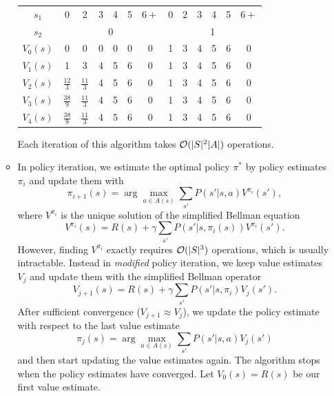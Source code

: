 \documentclass[11pt, a4paper]{article}
\begin{document}
\begin{enumerate}
\begin{solution}
\begin{itemize}
            \begin{table}[h]
                \centering
                \begin{tabular}{c|cccccc|cccccc}
                    \toprule
                    $s_1$    & 0 & 2 & 3 & 4 & 5 & $6+$ & 0 & 2 & 3 & 4 & 5 & $6+$ \\
                    $s_2$    & \multicolumn{6}{c|}{0}   & \multicolumn{6}{c}{1}    \\
                    \midrule
                    $V_0(s)$ & 0 & 0 & 0 & 0 & 0 & 0    & 1 & 3 & 4 & 5 & 6 & 0    \\
                    $V_1(s)$ & 1 & 3 & 4 & 5 & 6 & 0    & 1 & 3 & 4 & 5 & 6 & 0    \\
                    $V_2(s)$ & $\frac{12}{3}$ & $\frac{11}{3}$ & 4 & 5 & 6 & 0 & 1 & 3 & 4 & 5 & 6 & 0 \\
                    $V_3(s)$ & $\frac{38}{9}$ & $\frac{11}{3}$ & 4 & 5 & 6 & 0 & 1 & 3 & 4 & 5 & 6 & 0 \\
                    $V_4(s)$ & $\frac{38}{9}$ & $\frac{11}{3}$ & 4 & 5 & 6 & 0 & 1 & 3 & 4 & 5 & 6 & 0 \\
                    \bottomrule
                \end{tabular}
            \end{table}

            Each iteration of this algorithm takes $\mathcal{O}(\lvert S\rvert^2 \lvert A\rvert)$ operations.

            \item In policy iteration, we estimate the optimal policy $\pi^*$ by policy estimates $\pi_i$ and update them with
            \begin{equation*}
                \pi_{i+1}(s) = \arg \max_{a \in A(s)} \sum_{s'} P(s' | s, a) V^{\pi_i}(s'),
            \end{equation*}
            where $V^{\pi_i}$ is the unique solution of the simplified Bellman equation
            \begin{equation*}
                V^{\pi_i}(s) = R(s) + \gamma \sum_{s'} P(s' | s, \pi_i(s)) V^{\pi_i}(s') .
            \end{equation*}
            However, finding $V^{\pi_i}$ exactly requires $\mathcal{O}(\lvert S\rvert^3)$ operations, which is usually intractable. Instead in \emph{modified} policy iteration, we keep value estimates $V_j$ and update them with the simplified Bellman operator
            \begin{equation*}
                V_{j + 1}(s) = R(s) + \gamma \sum_{s'} P(s' | s, \pi_i) V_j(s') .
            \end{equation*}
            After sufficient convergence ($V_{j+1} \approx V_{j}$), we update the policy estimate with respect to the last value estimate
            \begin{equation*}
                \pi_j(s) = \arg \max_{a \in A(s)} \sum_{s'} P(s' | s, a) V_j(s')
            \end{equation*}
            and then start updating the value estimates again. The algorithm stops when the policy estimates have converged. Let $V_0(s) = R(s)$ be our first value estimate.


\end{itemize}
\end{solution}
\end{enumerate}
\end{document}

